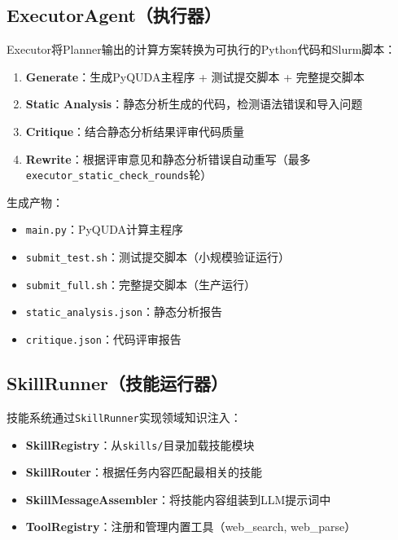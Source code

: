 \documentclass[12pt,a4paper]{ctexart}
\begin{document}
\subsection{ExecutorAgent（执行器）}

Executor将Planner输出的计算方案转换为可执行的Python代码和Slurm脚本：

\begin{enumerate}[leftmargin=*]
    \item \textbf{Generate}：生成PyQUDA主程序 + 测试提交脚本 + 完整提交脚本
    \item \textbf{Static Analysis}：静态分析生成的代码，检测语法错误和导入问题
    \item \textbf{Critique}：结合静态分析结果评审代码质量
    \item \textbf{Rewrite}：根据评审意见和静态分析错误自动重写（最多\texttt{executor\_static\_check\_rounds}轮）
\end{enumerate}

生成产物：
\begin{itemize}[leftmargin=*]
    \item \texttt{main.py}：PyQUDA计算主程序
    \item \texttt{submit\_test.sh}：测试提交脚本（小规模验证运行）
    \item \texttt{submit\_full.sh}：完整提交脚本（生产运行）
    \item \texttt{static\_analysis.json}：静态分析报告
    \item \texttt{critique.json}：代码评审报告
\end{itemize}

\subsection{SkillRunner（技能运行器）}

技能系统通过\texttt{SkillRunner}实现领域知识注入：

\begin{itemize}[leftmargin=*]
    \item \textbf{SkillRegistry}：从\texttt{skills/}目录加载技能模块
    \item \textbf{SkillRouter}：根据任务内容匹配最相关的技能
    \item \textbf{SkillMessageAssembler}：将技能内容组装到LLM提示词中
    \item \textbf{ToolRegistry}：注册和管理内置工具（web\_search, web\_parse）
\end{itemize}

\end{document}
